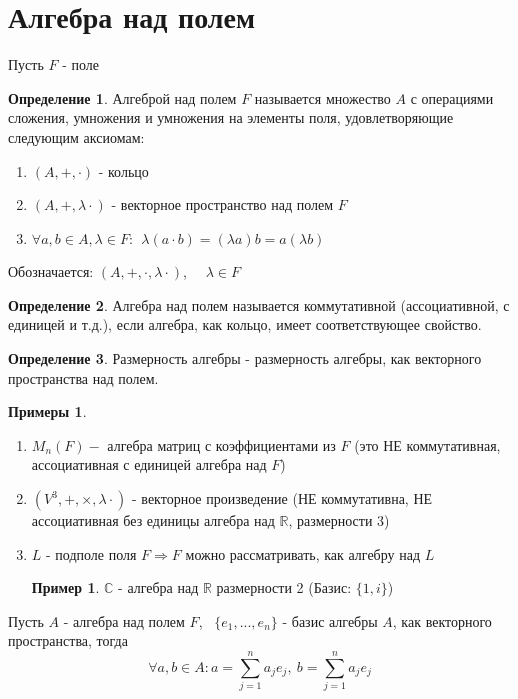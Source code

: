 \documentclass[a4paper, 12pt]{article}
\newcommand{\R}{\mathbb R}
\newcommand\tab[1][.5cm]{\hspace*{#1}}
\theoremstyle{definition}
\newtheorem*{definition}{Определение}
\newtheorem*{example}{Примеры}
\newtheorem*{example1}{Пример}
\begin{document}
  \newpage
  
  \section{Алгебра над полем}
  Пусть $F$ - поле 
  \begin{definition}
    Алгеброй над полем $F$ называется множество $A$ с операциями сложения, умножения и умножения на элементы поля, удовлетворяющие следующим аксиомам:
    \begin{enumerate}
      \item $(A, +, \cdot)$ - кольцо
      \item $(A, +, \lambda \cdot)$ - векторное пространство над полем $F$
      \item $\forall a, b \in A, \lambda\in F: \ \ \lambda(a \cdot b) = (\lambda a)b = a(\lambda b)$    
    \end{enumerate}
    Обозначается: $(A, +, \cdot, \lambda \cdot)$, \ \ $\lambda\in F$ 
  \end{definition}
  \begin{definition}
    Алгебра над полем называется коммутативной (ассоциативной, с единицей и т.д.), если алгебра, как кольцо, имеет соответствующее свойство.
  \end{definition}
  \begin{definition}
    Размерность алгебры - размерность алгебры, как векторного пространства над полем.
  \end{definition} 
  \begin{example}\tab
    \begin{enumerate}
      \item $M_n(F) -$ алгебра матриц с коэффициентами из $F$ (это НЕ коммутативная, ассоциативная с единицей алгебра над $F$)
      \item $(V^3, +, \times, \lambda \cdot)$ - векторное произведение (НЕ коммутативна, НЕ ассоциативная без единицы алгебра над $\R$, размерности 3)
      \item $L$ - подполе поля $F \Longrightarrow F$ можно рассматривать, как алгебру над $L$  
      \begin{example1}
        $\mathbb{C}$ - алгебра над $\R$ размерности 2 (Базис: $\{1, i\}$) 
      \end{example1}
    \end{enumerate}
  \end{example}
  Пусть $A$ - алгебра над полем $F$, \ $\{e_1,...,e_n\}$ - базис алгебры $A$, как векторного пространства, тогда $$\forall a, b \in A: a = \sum \limits_{j=1}^na_je_j, \ b = \sum \limits_{j=1}^na_je_j$$ 
\end{document}
